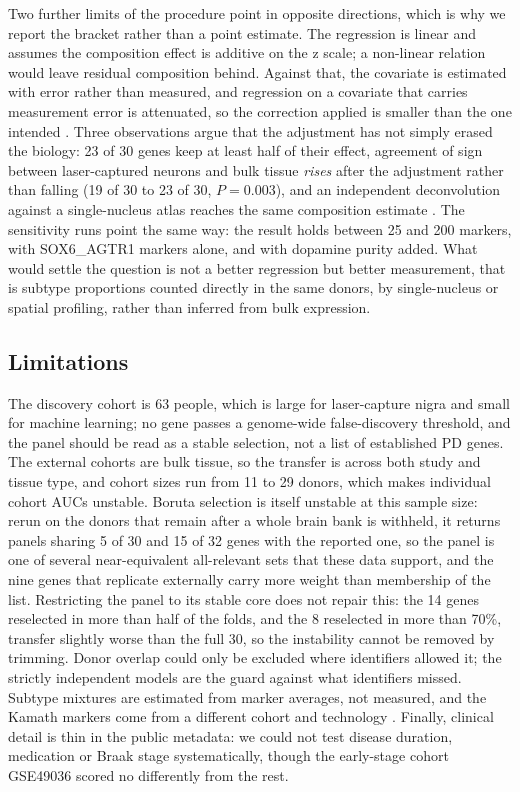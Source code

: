 \documentclass[11pt,a4paper]{article}
\begin{document}
Two further limits of the procedure point in opposite directions, which is why we report the bracket rather
than a point estimate. The regression is linear and assumes the composition effect is additive on the z scale;
a non-linear relation would leave residual composition behind. Against that, the covariate is estimated with
error rather than measured, and regression on a covariate that carries measurement error is attenuated, so
the correction applied is smaller than the one intended \citep{frost2000}. Three observations argue that the adjustment has not simply erased the
biology: 23 of 30 genes keep at least half of their effect, agreement of sign between laser-captured neurons
and bulk tissue \emph{rises} after the adjustment rather than falling (19 of 30 to 23 of 30, $P=0.003$), and
an independent deconvolution against a single-nucleus atlas reaches the same composition estimate
\citep{smajic2022,newman2015,wang2019}. The sensitivity runs point the same way: the result holds between 25
and 200 markers, with SOX6\_AGTR1 markers alone, and with dopamine purity added. What would settle the
question is not a better regression but better measurement, that is subtype proportions counted directly in
the same donors, by single-nucleus or spatial profiling, rather than inferred from bulk expression.

\subsection*{Limitations}

The discovery cohort is 63 people, which is large for laser-capture nigra and small for machine learning; no
gene passes a genome-wide false-discovery threshold, and the panel should be read as a stable selection, not a
list of established PD genes. The external cohorts are bulk tissue, so the transfer is across both study and
tissue type, and cohort sizes run from 11 to 29 donors, which makes individual cohort AUCs unstable. Boruta selection is itself
unstable at this sample size: rerun on the donors that remain after a whole brain bank is withheld, it returns
panels sharing 5 of 30 and 15 of 32 genes with the reported one, so the panel is one of several
near-equivalent all-relevant sets that these data support, and the nine genes that replicate externally carry
more weight than membership of the list. Restricting the panel to its stable core does not repair this:
the 14 genes reselected in more than half of the folds, and the 8 reselected in more than 70\%, transfer
slightly worse than the full 30, so the instability cannot be removed by trimming. Donor overlap could only be excluded where identifiers allowed it; the strictly independent models are the guard
against what identifiers missed. Subtype mixtures are estimated from marker averages, not measured, and the
Kamath markers come from a different cohort and technology \citep{kamath2022}. Finally, clinical detail is
thin in the public metadata: we could not test disease duration, medication or Braak stage systematically,
though the early-stage cohort GSE49036 \citep{dijkstra2015} scored no differently from the rest.
\end{document}
